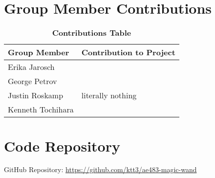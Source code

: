 \appendix

\section{Group Member Contributions} \label{apx:contributions}
    \begin{table}[H]
        \begin{center}
        \caption{\textbf{Contributions Table}}
        \begin{tabular}{ | p{2in} | p{4in}| } 
            \hline
            \textbf{Group Member} & \textbf{Contribution to Project} \\  \hline
            Erika Jarosch & \\ \hline
            George Petrov & \\ \hline
            Justin Roskamp & literally nothing \\ \hline
            Kenneth Tochihara & \\ \hline
        \end{tabular}
        \end{center}
    \end{table}

\section{Code Repository}
    GitHub Repository: \url{https://github.com/ktt3/ae483-magic-wand}
